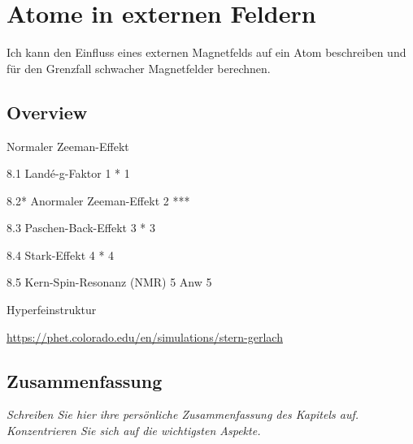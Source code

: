 \renewcommand{\lastmod}{10. September 2024}
\renewcommand{\chapterauthors}{Markus Lippitz}

\chapter{Atome in externen Feldern}





Ich kann den Einfluss eines externen Magnetfelds auf ein Atom beschreiben und für den Grenzfall schwacher Magnetfelder berechnen.

\section{Overview}


Normaler Zeeman-Effekt

8.1 Landé-g-Faktor 1	*	1 

8.2* Anormaler Zeeman-Effekt 2	***

8.3 Paschen-Back-Effekt 3	*	3 

8.4 Stark-Effekt 4	*	4 

8.5 Kern-Spin-Resonanz (NMR) 5	Anw	5 

Hyperfeinstruktur 


\url{https://phet.colorado.edu/en/simulations/stern-gerlach}




\section{Zusammenfassung}

\textit{Schreiben Sie hier ihre persönliche Zusammenfassung des Kapitels auf. Konzentrieren Sie sich auf die wichtigsten Aspekte.}

\vspace*{10cm}

\printbibliography[segment=\therefsegment,heading=subbibliography]

